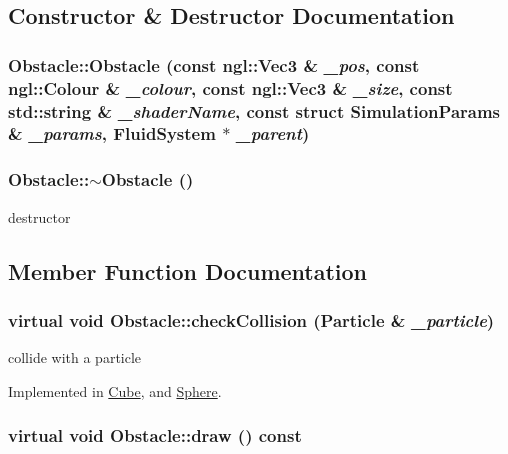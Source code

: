 \subsection{Constructor \& Destructor Documentation}
\hypertarget{classObstacle_aa896fb4d70044e9421ccb9c757ed2d3c}{
\subsubsection[{Obstacle}]{\setlength{\rightskip}{0pt plus 5cm}Obstacle::Obstacle (const ngl::Vec3 \& {\em \_\-pos}, \/  const ngl::Colour \& {\em \_\-colour}, \/  const ngl::Vec3 \& {\em \_\-size}, \/  const std::string \& {\em \_\-shaderName}, \/  const struct {\bf SimulationParams} \& {\em \_\-params}, \/  {\bf FluidSystem} $\ast$ {\em \_\-parent})}}
\label{classObstacle_aa896fb4d70044e9421ccb9c757ed2d3c}
\hypertarget{classObstacle_af2f9cc9c6cff75dca0974fd5ac4f71a9}{
\subsubsection[{$\sim$Obstacle}]{\setlength{\rightskip}{0pt plus 5cm}Obstacle::$\sim$Obstacle ()}}
\label{classObstacle_af2f9cc9c6cff75dca0974fd5ac4f71a9}


destructor 

\subsection{Member Function Documentation}
\hypertarget{classObstacle_ae35a1937df593d5caf25c5545acbaffd}{
\subsubsection[{checkCollision}]{\setlength{\rightskip}{0pt plus 5cm}virtual void Obstacle::checkCollision ({\bf Particle} \& {\em \_\-particle})}}
\label{classObstacle_ae35a1937df593d5caf25c5545acbaffd}


collide with a particle 

Implemented in \hyperlink{classCube_a6e53f829d8ebcbd53ea462e53d07f64f}{Cube}, and \hyperlink{classSphere_a0a18ee7f656154b8c1f60d99bb418c98}{Sphere}.\hypertarget{classObstacle_a7476b22bcd25e3731a0ef2aa5324afa0}{
\subsubsection[{draw}]{\setlength{\rightskip}{0pt plus 5cm}virtual void Obstacle::draw () const}}
\label{classObstacle_a7476b22bcd25e3731a0ef2aa5324afa0}


